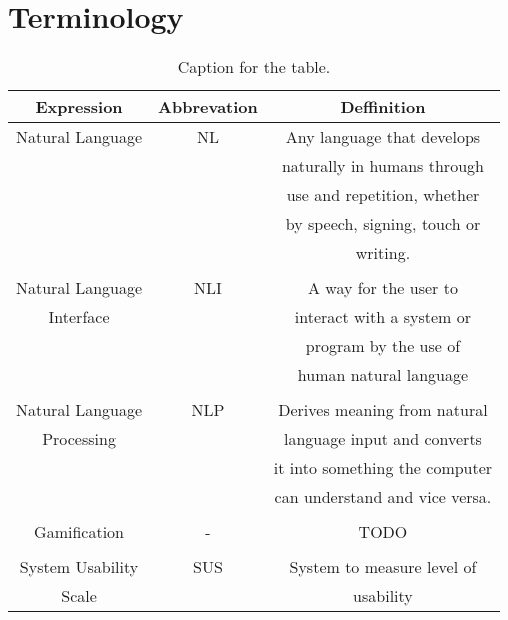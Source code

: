 \section{Terminology}

\begin{table}[h!]
  \centering
  \begin{tabular}{ccc}
    \toprule
    Expression & Abbrevation & Deffinition\\
    \midrule
    Natural Language & NL & Any language that develops\\
    & & naturally in humans through\\
    & & use and repetition, whether\\
    & & by speech, signing, touch or\\
    & & writing.\\
    \\
    Natural Language & NLI & A way for the user to\\
    Interface & & interact with a system or\\ 
    & & program by the use of\\
    & & human natural language\\
    \\
    Natural Language & NLP & Derives meaning from natural\\
    Processing & & language input and converts\\
    & & it into something the computer\\
    & & can understand and vice versa.\\
    \\
    Gamification & - & TODO \\
    \\
    System Usability & SUS & System to measure level of\\
    Scale & &  usability\\
    \bottomrule
  \end{tabular}
  \caption{Caption for the table.}\label{termin}
\end{table}